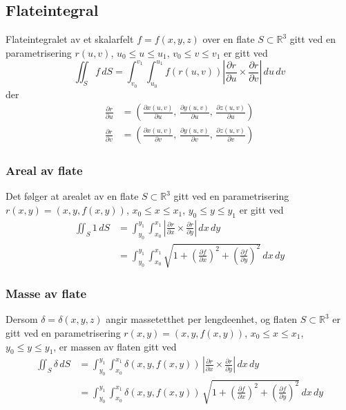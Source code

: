 \documentclass{article}
\begin{document}
\subsection{Flateintegral}
Flateintegralet av et skalarfelt $f = f(x, y, z)$ over en flate $S \subset \mathbb{R}^3$ gitt ved en parametrisering $r(u, v)$, $u_0 \leq u \leq u_1$, $v_0 \leq v \leq v_1$ er gitt ved
\[\iint_S f\,dS=\int_{v_0}^{v_1}\int_{u_0}^{u_1} f(r(u,v)) \left| \frac{\partial r}{\partial u} \times \frac{\partial r}{\partial v} \right|\,du\,dv\]
der
\begin{align*}
    \frac{\partial r}{\partial u} &= \left( \frac{\partial x(u, v)}{\partial u},\, \frac{\partial y(u, v)}{\partial u},\, \frac{\partial z(u, v)}{\partial u} \right)\\
    \frac{\partial r}{\partial v} &= \left( \frac{\partial x(u, v)}{\partial v},\, \frac{\partial y(u, v)}{\partial v},\, \frac{\partial z(u, v)}{\partial v} \right)
\end{align*}
\subsubsection{Areal av flate}
Det følger at arealet av en flate $S \subset \mathbb{R}^3$ gitt ved en parametrisering $r(x, y) = (x, y, f(x, y))$, $x_0 \leq x \leq x_1$, $y_0 \leq y \leq y_1$ er gitt ved
\begin{align*}
    \iint_S 1\,dS &= \int_{y_0}^{y_1}\int_{x_0}^{x_1} \left| \frac{\partial r}{\partial x} \times \frac{\partial r}{\partial y} \right|\,dx\,dy\\
    &= \int_{y_0}^{y_1}\int_{x_0}^{x_1} \sqrt{1 + \left(\frac{\partial f}{\partial x}\right)^2 + \left(\frac{\partial f}{\partial y}\right)^2}\,dx\,dy
\end{align*}
\subsubsection{Masse av flate}
Dersom $\delta = \delta(x, y, z)$ angir massetetthet per lengdeenhet, og flaten $S \subset \mathbb{R}^3$ er gitt ved en parametrisering $r(x, y) = (x, y, f(x, y))$, $x_0 \leq x \leq x_1$, $y_0 \leq y \leq y_1$, er massen av flaten gitt ved
\begin{align*}
    \iint_S \delta\,dS &= \int_{y_0}^{y_1}\int_{x_0}^{x_1} \delta(x, y, f(x, y))\, \left| \frac{\partial r}{\partial x} \times \frac{\partial r}{\partial y} \right|\,dx\,dy\\
    &= \int_{y_0}^{y_1}\int_{x_0}^{x_1} \delta(x, y, f(x, y))\, \sqrt{1 + \left(\frac{\partial f}{\partial x}\right)^2 + \left(\frac{\partial f}{\partial y}\right)^2}\,dx\,dy
\end{align*}
\end{document}
